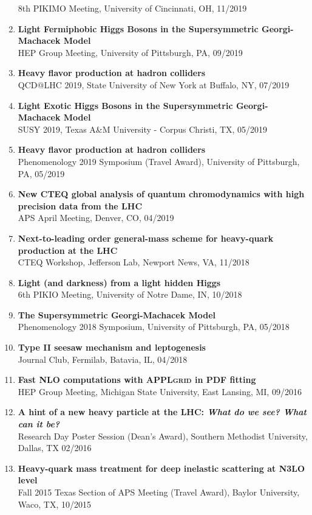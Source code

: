 \documentclass[12pt]{article}
\begin{document}
\begin{enumerate}
8th PIKIMO Meeting, University of Cincinnati, OH, 11/2019
\item \textbf{Light Fermiphobic Higgs Bosons in the Supersymmetric Georgi-Machacek Model}\\
HEP Group Meeting, University of Pittsburgh, PA, 09/2019
\item \textbf{Heavy flavor production at hadron colliders}\\
QCD@LHC 2019, State University of New York at Buffalo, NY, 07/2019
\item \textbf{Light Exotic Higgs Bosons in the Supersymmetric Georgi-Machacek Model}\\
SUSY 2019, Texas A\&M University - Corpus Christi, TX, 05/2019
\item \textbf{Heavy flavor production at hadron colliders}\\
Phenomenology 2019 Symposium (Travel Award), University of Pittsburgh, PA, 05/2019
\item \textbf{New CTEQ global analysis of quantum chromodynamics with high precision data from the LHC}\\
APS April Meeting, Denver, CO, 04/2019
\item \textbf{Next-to-leading order general-mass scheme for heavy-quark production at the LHC}\\
CTEQ Workshop, Jefferson Lab,  Newport News, VA, 11/2018
\item \textbf{Light (and darkness) from a light hidden Higgs}\\
6th PIKIO Meeting, University of Notre Dame, IN, 10/2018
\item \textbf{The Supersymmetric Georgi-Machacek Model}\\
Phenomenology 2018 Symposium, University of Pittsburgh, PA,  05/2018
\item \textbf{Type II seesaw mechanism and leptogenesis}\\
Journal Club, Fermilab, Batavia, IL, 04/2018
\item \textbf{Fast NLO computations with \textsc{APPLgrid} in PDF fitting}\\
HEP Group Meeting, Michigan State University, East Lansing, MI, 09/2016
\item  \textbf{A hint of a new heavy particle at the LHC: \emph{What do we see? What can it be?}}\\
Research Day Poster Session (Dean's Award), Southern Methodist University, Dallas, TX 02/2016
\item \textbf{Heavy-quark mass treatment for deep inelastic scattering at N3LO level}\\
Fall 2015 Texas Section of APS Meeting (Travel Award), Baylor University, Waco, TX, 10/2015
\end{enumerate}
\end{document}
